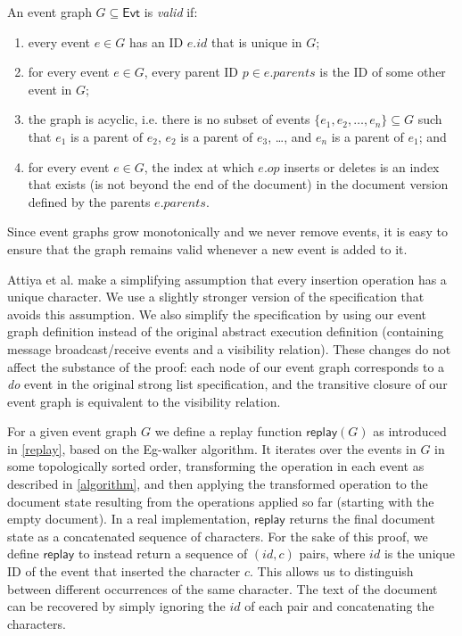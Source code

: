 \documentclass[sigplan,10pt]{acmart}
\newcommand{\algname}{Eg-walker\xspace}
\begin{document}
\begin{definition}\label{valid-graph}
  An event graph $G \subseteq \mathsf{Evt}$ is \emph{valid} if:
  \begin{enumerate}
    \item every event $e \in G$ has an ID $e.\mathit{id}$ that is unique in $G$;
    \item for every event $e \in G$, every parent ID $p \in e.\mathit{parents}$ is the ID of some other event in $G$;
    \item the graph is acyclic, i.e. there is no subset of events $\{e_1, e_2, \dots, e_n\} \subseteq G$ such that $e_1$ is a parent of $e_2$, $e_2$ is a parent of $e_3$, \dots, and $e_n$ is a parent of $e_1$; and
    \item for every event $e \in G$, the index at which $e.\mathit{op}$ inserts or deletes is an index that exists (is not beyond the end of the document) in the document version defined by the parents $e.\mathit{parents}$.
  \end{enumerate}
\end{definition}

Since event graphs grow monotonically and we never remove events, it is easy to ensure that the graph remains valid whenever a new event is added to it.

Attiya et al. make a simplifying assumption that every insertion operation has a unique character.
We use a slightly stronger version of the specification that avoids this assumption.
We also simplify the specification by using our event graph definition instead of the original abstract execution definition (containing message broadcast/receive events and a visibility relation).
These changes do not affect the substance of the proof: each node of our event graph corresponds to a \emph{do} event in the original strong list specification, and the transitive closure of our event graph is equivalent to the visibility relation.

For a given event graph $G$ we define a replay function $\mathsf{replay}(G)$ as introduced in \autoref{replay}, based on the \algname algorithm.
It iterates over the events in $G$ in some topologically sorted order, transforming the operation in each event as described in \autoref{algorithm}, and then applying the transformed operation to the document state resulting from the operations applied so far (starting with the empty document).
In a real implementation, $\mathsf{replay}$ returns the final document state as a concatenated sequence of characters.
For the sake of this proof, we define $\mathsf{replay}$ to instead return a sequence of $(\mathit{id}, c)$ pairs, where $\mathit{id}$ is the unique ID of the event that inserted the character $c$.
This allows us to distinguish between different occurrences of the same character.
The text of the document can be recovered by simply ignoring the $\mathit{id}$ of each pair and concatenating the characters.
\end{document}
